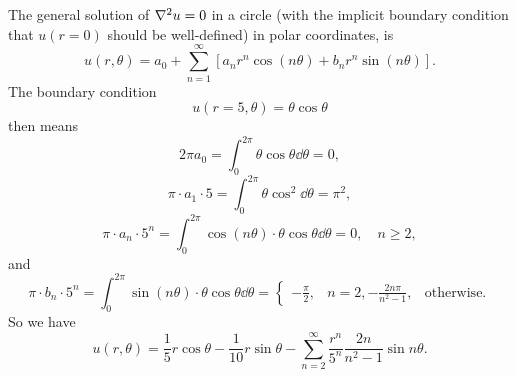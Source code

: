 \documentclass[hyperref, a4paper]{article}
\def\\{}%
\begin{document}
\section{}

The general solution of $\laplacian u = 0$ in a circle 
(with the implicit boundary condition that $u(r=0)$ should be well-defined)
in polar coordinates, is 
\begin{equation}
    u(r, \theta)=a_0+\sum_{n=1}^{\infty}\left[a_n r^n \cos (n \theta)+b_n r^n \sin (n \theta)\right].
\end{equation}
The boundary condition 
\begin{equation}
    u(r = 5, \theta) = \theta \cos \theta
\end{equation}
then means 
\begin{equation}
    2\pi a_0 = \int_{0}^{2\pi} \theta \cos \theta \dd{\theta} = 0,
\end{equation}
\begin{equation}
    \pi \cdot a_1 \cdot 5 = \int_{0}^{2\pi} \theta \cos^2 \dd{\theta} = \pi^2,
\end{equation}
\begin{equation}
    \pi \cdot a_n \cdot 5^n = \int_{0}^{2\pi} \cos(n \theta) \cdot \theta \cos \theta \dd{\theta} = 0, \quad n \geq 2,
\end{equation}
and 
\begin{equation}
    \pi \cdot b_n \cdot 5^n = \int_{0}^{2\pi} \sin(n \theta) \cdot \theta \cos \theta \dd{\theta} 
    = \begin{cases}
        - \frac{\pi}{2}, &n = 2, \\
        - \frac{2n \pi}{n^2 - 1}, & \text{otherwise}.
    \end{cases}
\end{equation}
So we have 
\begin{equation}
    u(r, \theta) = \frac{1}{5} r \cos \theta - \frac{1}{10} r \sin \theta - \sum_{n=2}^{\infty} \frac{r^n}{5^n} \frac{2n}{n^2 - 1} \sin n \theta.
\end{equation}
\end{document}
